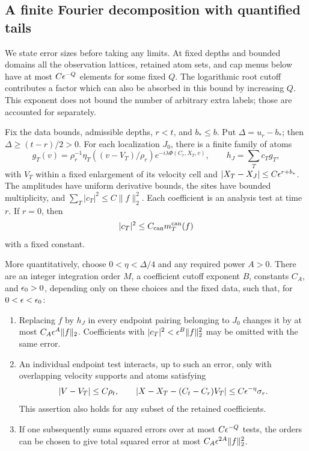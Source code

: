 \subsection{A finite Fourier decomposition with quantified tails}

We state error sizes before taking any limits.  At fixed depths and
bounded domains all the observation lattices, retained atom sets,
and cap menus below have at most \(C\epsilon^{-Q}\) elements for some
fixed \(Q\).  The logarithmic root cutoff contributes a factor which
can also be absorbed in this bound by increasing \(Q\).  This exponent
does not bound the number of arbitrary extra labels; those are
accounted for separately.

\begin{lemma}
\label{lem:packet-decomposition}
Fix the data bounds, admissible depths, \(r<t\), and \(b_*\le b\).
Put
\(\Delta=u_r-b_*\); then \(\Delta\ge(t-r)/2>0\).
For each localization \(J_0\), there is a finite family of atoms
\begin{equation}
 g_T(v)=\rho_r^{-1}\eta_T((v-V_T)/\rho_r)
                     e^{-i\lambda\Phi(C_r,X_T,v)},
 \qquad h_J=\sum_Tc_Tg_T,
 \label{eq:packet-earlier-atoms}
\end{equation}
with \(V_T\) within a fixed enlargement of its velocity cell and
\(|X_T-X_J|\le C\epsilon^{r+b_*}\).  The amplitudes have uniform
derivative bounds, the sites have bounded multiplicity, and
\(\sum_T|c_T|^2\le C\|f\|_2^2\).  Each coefficient is an analysis
test at time \(r\).  If \(r=0\), then
\begin{equation}
 |c_T|^2\le C_{\rm can}m_T^{\rm can}(f)
 \label{eq:packet-coeff-canonical}
\end{equation}
with a fixed constant.

More quantitatively, choose \(0<\eta<\Delta/4\) and any required
power \(A>0\).  There are an integer integration order \(M\), a
coefficient cutoff exponent \(B\), constants \(C_A\), and
\(\epsilon_0>0\), depending only on these choices and the fixed data,
such that, for \(0<\epsilon<\epsilon_0\):

\begin{enumerate}
\item Replacing \(f\) by \(h_J\) in every endpoint pairing belonging
to \(J_0\) changes it by at most \(C_A\epsilon^A\|f\|_2\).
Coefficients with \(|c_T|^2<\epsilon^B\|f\|_2^2\) may be omitted with
the same error.
\item An individual endpoint test interacts, up to such an error,
only with overlapping velocity supports and atoms satisfying
\begin{equation}
 |V-V_T|\le C\rho_t,\qquad
 |X-X_T-(C_t-C_r)V_T|\le C\epsilon^{-\eta}\sigma_r.
 \label{eq:packet-transport}
\end{equation}
This assertion also holds for any subset of the retained coefficients.
\item If one subsequently sums squared errors over at most
\(C\epsilon^{-Q}\) tests, the orders can be chosen to give total squared
error at most \(C_A\epsilon^{2A}\|f\|_2^2\).
\end{enumerate}


\end{lemma}

